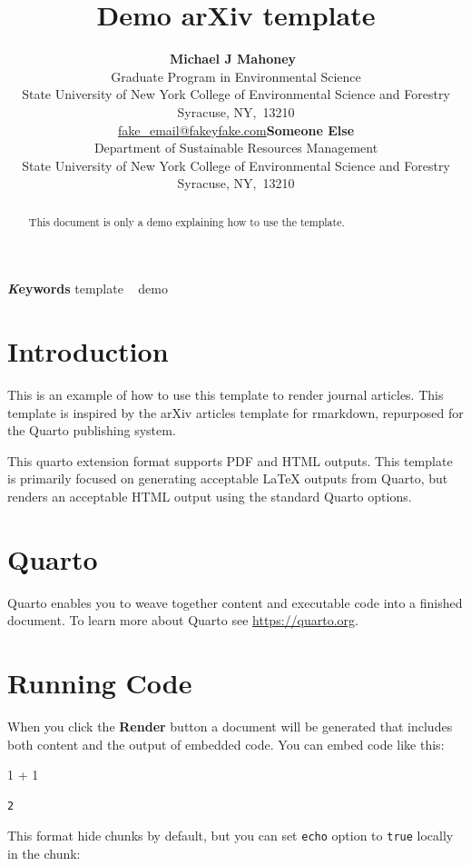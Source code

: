 \documentclass[
]{article}
\title{Demo arXiv template}
\author{\textbf{Michael J
Mahoney}~\orcidlink{0000-0003-2402-304X}\\Graduate Program in
Environmental Science\\State University of New York College of
Environmental Science and Forestry\\Syracuse,
NY,\ 13210\\\href{mailto:fake\_email@fakeyfake.com}{fake\_email@fakeyfake.com}\asep\textbf{Someone
Else}\\Department of Sustainable Resources Management\\State University
of New York College of Environmental Science and Forestry\\Syracuse,
NY,\ 13210\\}
\date{}
\newenvironment{Shaded}{\begin{snugshade}}{\end{snugshade}}
\newcommand{\DecValTok}[1]{\textcolor[rgb]{0.68,0.00,0.00}{#1}}
\newcommand{\OperatorTok}[1]{\textcolor[rgb]{0.37,0.37,0.37}{#1}}
\begin{document}
\maketitle
\begin{abstract}
This document is only a demo explaining how to use the template.
\end{abstract}
{\bfseries \emph Keywords}
\def\sep{\textbullet\ }
template \sep
demo



\section{Introduction}\label{sec-intro}

This is an example of how to use this template to render journal
articles. This template is inspired by the arXiv articles template for
rmarkdown, repurposed for the Quarto publishing system.

This quarto extension format supports PDF and HTML outputs. This
template is primarily focused on generating acceptable {\LaTeX} outputs
from Quarto, but renders an acceptable HTML output using the standard
Quarto options.

\section{Quarto}\label{quarto}

Quarto enables you to weave together content and executable code into a
finished document. To learn more about Quarto see
\url{https://quarto.org}.

\section{Running Code}\label{running-code}

When you click the \textbf{Render} button a document will be generated
that includes both content and the output of embedded code. You can
embed code like this:

\begin{Shaded}
\begin{Highlighting}[]
\DecValTok{1} \OperatorTok{+} \DecValTok{1}
\end{Highlighting}
\end{Shaded}

\begin{verbatim}
2
\end{verbatim}

This format hide chunks by default, but you can set \texttt{echo} option
to \texttt{true} locally in the chunk:
\end{document}
